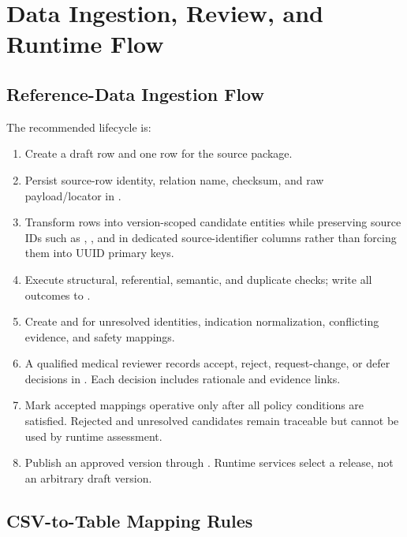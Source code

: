 \section{Data Ingestion, Review, and Runtime Flow}

\subsection{Reference-Data Ingestion Flow}

The recommended lifecycle is:
\begin{enumerate}
  \item Create a draft  row and one  row for the source package.
  \item Persist source-row identity, relation name, checksum, and raw payload/locator in .
  \item Transform rows into version-scoped candidate entities while preserving source IDs such as , , and  in dedicated source-identifier columns rather than forcing them into UUID primary keys.
  \item Execute structural, referential, semantic, and duplicate checks; write all outcomes to .
  \item Create  and  for unresolved identities, indication normalization, conflicting evidence, and safety mappings.
  \item A qualified medical reviewer records accept, reject, request-change, or defer decisions in . Each decision includes rationale and evidence links.
  \item Mark accepted mappings operative only after all policy conditions are satisfied. Rejected and unresolved candidates remain traceable but cannot be used by runtime assessment.
  \item Publish an approved version through . Runtime services select a release, not an arbitrary draft version.
\end{enumerate}

\subsection{CSV-to-Table Mapping Rules}

